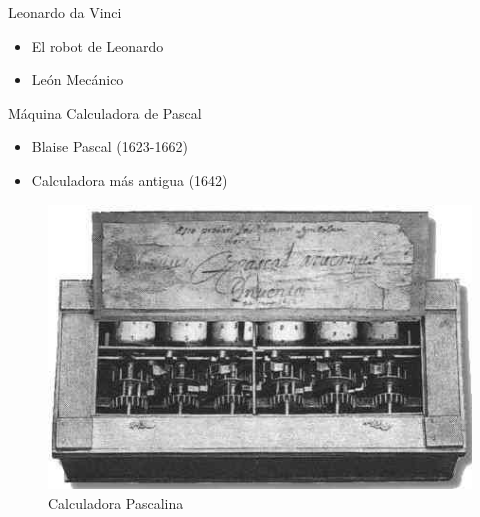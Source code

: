 
\begin{frame}[fragile]{Leonardo da Vinci}
\vspace{8px}
\pause
{}
\begin{block}{}
	\begin{itemize}
		\item El robot de Leonardo
		\pause
		\item León Mecánico
	\end{itemize}
\end{block}
\end{frame}



\begin{frame}[fragile]{Máquina Calculadora de Pascal}
\vspace{8px}
\pause
{}
\begin{block}{}
	\begin{itemize}
		\item Blaise Pascal (1623-1662)
		\pause
		\item Calculadora más antigua (1642)
	\end{itemize}
\end{block}
\begin{figure}
		\centering
		\includegraphics[scale=0.3]{./EtapaPrimeriza/imagenes/cp.jpg}
		\caption{Calculadora Pascalina}
\end{figure}
\end{frame}




